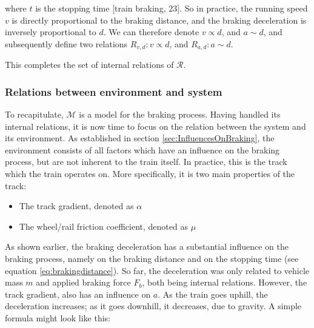 \noindent
where $t$ is the stopping time [train braking, 23]. So in practice, the running speed $v$ is directly proportional to the braking distance, and the braking deceleration is inversely proportional to $d$. We can therefore denote $v \propto d$, and $a \sim d$, and subsequently define two relations $R_{v,d}: v \propto d$, and $R_{a,d}: a \sim d$.
\par
This completes the set of internal relations of ${\mathcal{R}}$.

\bigskip\noindent{}

\subsubsection{Relations between environment and system}
\label{sec:RelationsEnvironmentSystem}
\par\noindent
To recapitulate, ${\mathcal{M}}$ is a model for the braking process. Having handled its internal relations, it is now time to focus on the relation between the system and its environment. As established in section \ref{sec:InfluencesOnBraking}, the environment consists of all factors which have an influence on the braking process, but are not inherent to the train itself. In practice, this is the track which the train operates on. More specifically, it is two main properties of the track:
\begin{itemize}
	\item The track gradient, denoted as $\alpha$
	\item The wheel/rail friction coefficient, denoted as $\mu$
\end{itemize}
\noindent
As shown earlier, the braking deceleration has a substantial influence on the braking process, namely on the braking distance and on the stopping time (see equation \ref{eq:brakingdistance}). So far, the deceleration was only related to vehicle mass $m$ and applied braking force $F_{b}$, both being internal relations. However, the track gradient, also has an influence on $a$. As the train goes uphill, the deceleration increases; as it goes downhill, it decreases, due to gravity. A simple formula might look like this:

